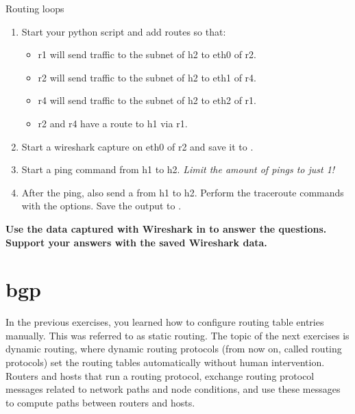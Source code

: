 \begin{exercise}{Routing loops}
	\begin{enumerate}
		\item Start your python script and add routes so that:
			\begin{itemize}
				\item r1 will send traffic to the subnet of h2 to eth0 of r2.
				\item r2 will send traffic to the subnet of h2 to eth1 of r4.
				\item r4 will send traffic to the subnet of h2 to eth2 of r1.
				\item r2 and r4 have a route to h1 via r1.
			\end{itemize}
		\item Start a wireshark capture on eth0 of r2 and save it to .
		\item Start a ping command from h1 to h2. \emph{Limit the amount of pings to just 1!}
		\item After the ping, also send a  from h1 to h2. Perform the traceroute commands with the  options. Save the output to .
	\end{enumerate}

	\textbf{Use the data captured with Wireshark in  to answer the questions. Support your answers with the saved Wireshark data.}

\end{exercise}

\newpage
\section{\acl{bgp}}\label{sec:bgp}

In the previous exercises, you learned how to configure routing table entries manually. This was referred to as static routing. The topic of the next exercises is dynamic routing, where dynamic routing protocols (from now on, called routing protocols) set the routing tables automatically without human intervention. Routers and hosts that run a routing protocol, exchange routing protocol messages related to network paths and node conditions, and use these messages to compute paths between routers and hosts.

